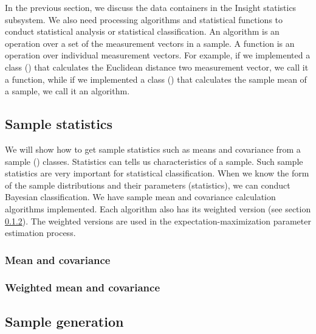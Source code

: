 In the previous section, we discuss the data containers in the Insight
statistics subsystem. We also need processing algorithms and
statistical functions to conduct statistical analysis or statistical
classification. An algorithm is an operation over a set of the
measurement vectors in a sample. A function is an operation over
individual measurement vectors. For example, if we implemented a class
() that calculates the
Euclidean distance two measurement vector, we call it a function,
while if we implemented a class
() that calculates the sample
mean of a sample, we call it an algorithm.

\subsection{Sample statistics}
\label{sec:SampleStatistics}

 We will show how to get sample statistics such as means and
 covariance from a sample ()
 classes. Statistics can tells us characteristics of a sample. Such
 sample statistics are very important for statistical
 classification. When we know the form of the sample distributions and
 their parameters (statistics), we can conduct Bayesian
 classification. We have sample mean and covariance calculation
 algorithms implemented. Each algorithm also has its weighted version
 (see section \ref{sec:WeightedMeanCovariance}). The weighted versions
 are used in the expectation-maximization parameter estimation
 process.

\subsubsection{Mean and covariance}
\label{sec:MeanCovariance}



\subsubsection{Weighted mean and covariance}
\label{sec:WeightedMeanCovariance}



\subsection{Sample generation}
\label{sec:SampleGeneration}

